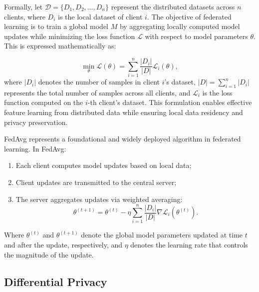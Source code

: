 \documentclass[journal,twoside,web]{ieeecolor}
\begin{document}
Formally, let $\mathcal{D} = \{D_1, D_2, \ldots, D_n\}$ represent the distributed datasets across $n$ clients, where $D_i$ is the local dataset of client $i$. The objective of federated learning is to train a global model $M$ by aggregating locally computed model updates while minimizing the loss function $\mathcal{L}$ with respect to model parameters $\theta$. This is expressed mathematically as:

\begin{equation}
\min_{\theta} \mathcal{L}(\theta) = \sum_{i=1}^{n} \frac{|D_i|}{|D|} \mathcal{L}_i (\theta),
\label{eq:fl_objective}
\end{equation}
where $|D_i|$ denotes the number of samples in client $i$'s dataset, $|D| = \sum_{i=1}^n |D_i|$ represents the total number of samples across all clients, and $\mathcal{L}_i$ is the loss function computed on the $i$-th client's dataset. This formulation enables effective feature learning from distributed data while ensuring local data residency and privacy preservation.

FedAvg\cite{fedavg} represents a foundational and widely deployed algorithm in federated learning. In FedAvg:
\begin{enumerate}
    \item Each client computes model updates based on local data;
    \item Client updates are transmitted to the central server;
    \item The server aggregates updates via weighted averaging:
    \begin{equation}
    \theta^{(t+1)} = \theta^{(t)} - \eta \sum_{i=1}^{n} \frac{|D_i|}{|D|} \nabla \mathcal{L}_i (\theta^{(t)}).
    \label{eq:fedavg}
    \end{equation}
\end{enumerate}

Where $\theta^{(t)}$ and $\theta^{(t+1)}$ denote the global model parameters updated at time $t$ and after the update, respectively, and $\eta$ denotes the learning rate that controls the magnitude of the update.

\subsection{Differential Privacy}
\end{document}
